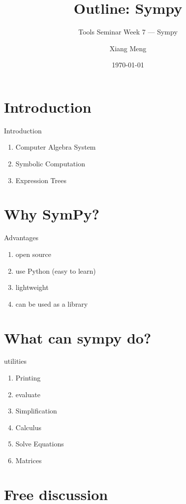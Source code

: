 \documentclass[english, nochinese]{../TeXTemplate/pkuslide}
\title{Outline: Sympy}
\subtitle{Tools Seminar Week 7 --- Sympy}
\author{Xiang Meng}
\date{\today}
\begin{document}
\begin{frame}
\titlepage
\end{frame}

\begin{frame}
\tableofcontents[subsectionstyle=hide]
\end{frame}

\section{Introduction}

\begin{frame}
\sectionpage
\end{frame}

\begin{frame}{Introduction}
\begin{enumerate}
\item Computer Algebra System
\item Symbolic Computation
\item Expression Trees
\end{enumerate}
\end{frame}

\section{Why SymPy?}

\begin{frame}
\sectionpage
\end{frame}

\begin{frame}{Advantages}
\begin{enumerate}
\item open source
\item use Python (easy to learn)
\item lightweight
\item can be used as a library
\end{enumerate}
\end{frame}

\section{What can sympy do?}

\begin{frame}
\sectionpage
\end{frame}

\begin{frame}{utilities}
\begin{enumerate}
\item Printing
\item evaluate
\item Simplification
\item Calculus
\item Solve Equations
\item Matrices
\end{enumerate}
\end{frame}

\section{Free discussion}

\begin{frame}
\sectionpage
\end{frame}
\end{document}
